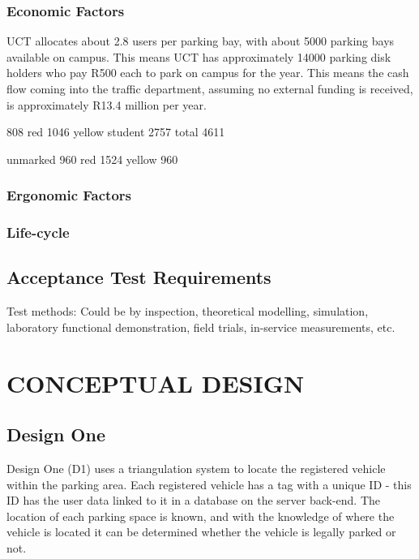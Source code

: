 \subsubsection{Economic Factors}
UCT allocates about 2.8 users per parking bay, with about 5000 parking bays available on campus. This means UCT has approximately 14000 parking disk holders who pay R500 each to park on campus for the year. This means the cash flow coming into the traffic department, assuming no external funding is received, is approximately R13.4 million per year. 

808 red
1046 yellow
student 2757
total 4611

unmarked 960
red 1524
yellow 960

\subsubsection{Ergonomic Factors}
\subsubsection{Life-cycle}
\subsection{Acceptance Test Requirements}
Test methods: Could be by inspection, theoretical modelling, simulation, laboratory functional demonstration, field trials, in-service measurements, etc.

\newpage
\section{CONCEPTUAL DESIGN}
\subsection{Design One}
Design One (D1) uses a triangulation system to locate the registered vehicle within the parking area. Each registered vehicle has a tag with a unique ID - this ID has the user data linked to it in a database on the server back-end. The location of each parking space is known, and with the knowledge of where the vehicle is located it can be determined whether the vehicle is legally parked or not. 
  
